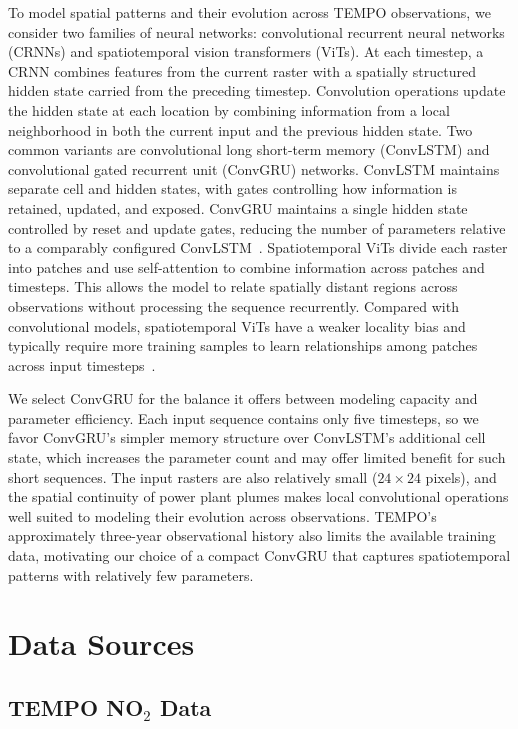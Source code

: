 \documentclass[sigconf,nonacm]{acmart}
\begin{document}
To model spatial patterns and their evolution across TEMPO observations, we
consider two families of neural networks: convolutional recurrent neural networks
(CRNNs) and spatiotemporal vision transformers (ViTs). At each timestep, a CRNN
combines features from the current raster with a spatially structured hidden state
carried from the preceding timestep. Convolution operations update the hidden state
at each location by combining information from a local neighborhood in both the
current input and the previous hidden state. Two common variants are convolutional
long short-term memory (ConvLSTM) and convolutional gated recurrent unit (ConvGRU)
networks. ConvLSTM maintains separate cell and hidden states, with gates controlling
how information is retained, updated, and exposed. ConvGRU maintains a single hidden
state controlled by reset and update gates, reducing the number of parameters
relative to a comparably configured ConvLSTM~\cite{shi2015convlstm,ballas2015convgru}.
Spatiotemporal ViTs divide each raster into patches and use self-attention to combine
information across patches and timesteps. This allows the model to relate spatially
distant regions across observations without processing the sequence recurrently.
Compared with convolutional models, spatiotemporal ViTs have a weaker locality bias
and typically require more training samples to learn relationships among patches
across input timesteps~\cite{bertasius2021timesformer}.

We select ConvGRU for the balance it offers between modeling capacity
and parameter efficiency. Each input sequence contains only five timesteps, so we favor ConvGRU's simpler
memory structure over ConvLSTM's additional cell state, which increases the
parameter count and may offer limited benefit for such short sequences. The input
rasters are also relatively small ($24 \times 24$ pixels), and the spatial continuity
of power plant plumes makes local convolutional operations well suited to modeling
their evolution across observations. TEMPO's approximately three-year observational
history also limits the available training data, motivating our choice of a compact
ConvGRU that captures spatiotemporal patterns with relatively few parameters.

\section{Data Sources}

\subsection{TEMPO NO\texorpdfstring{$_2$}{2} Data}
\end{document}
